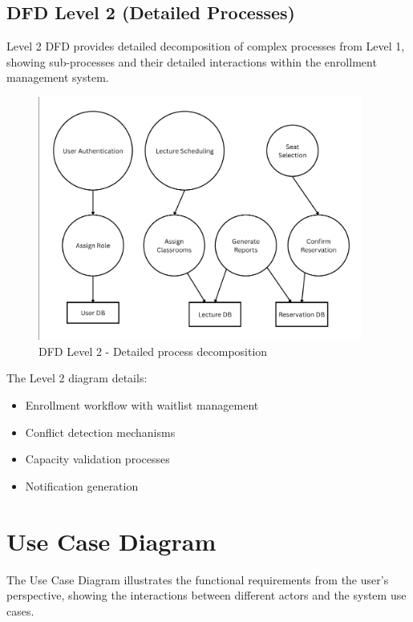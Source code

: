 \subsection{DFD Level 2 (Detailed Processes)}

Level 2 DFD provides detailed decomposition of complex processes from Level 1, showing sub-processes and their detailed interactions within the enrollment management system.

\begin{figure}[h]
    \centering
    \includegraphics[width=0.95\textwidth]{images/DFD Level 2.png}
    \caption{DFD Level 2 - Detailed process decomposition}
    \label{fig:dfd2}
\end{figure}

The Level 2 diagram details:
\begin{itemize}[leftmargin=*]
    \item Enrollment workflow with waitlist management
    \item Conflict detection mechanisms
    \item Capacity validation processes
    \item Notification generation
\end{itemize}

\section{Use Case Diagram}

The Use Case Diagram illustrates the functional requirements from the user's perspective, showing the interactions between different actors and the system use cases.

